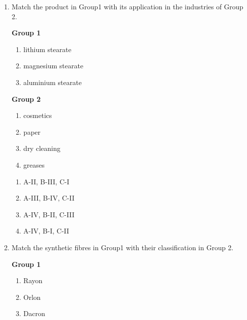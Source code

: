 \documentclass[journal,12pt,onecolumn]{IEEEtran}
\theoremstyle{remark}
\begin{document}
\begin{enumerate}
\begin{multicols}{4}
\begin{enumerate}
    \item A-I, B-IV, C-IV
    \item A-IV, B-I, C-II
    \item A-IV, B-I, C-III
    \item A-IV, B-III, C-I
\end{enumerate}
\end{multicols}

    
    \item Match the product in Group1 with its application in the industries of Group 2.

\begin{multicols}{2}
\textbf{Group 1}
\begin{enumerate}[label =\Alph*]
    \item lithium stearate
    \item magnesium stearate
    \item aluminium stearate
\end{enumerate}

\columnbreak

\textbf{Group 2}
\begin{enumerate}[label =\Roman*]
    \item cosmetics
    \item paper
    \item dry cleaning
    \item greases
\end{enumerate}
\end{multicols}

\begin{multicols}{4}
\begin{enumerate}
    \item A-II, B-III, C-I
    \item A-III, B-IV, C-II
    \item A-IV, B-II, C-III
    \item A-IV, B-I, C-II
\end{enumerate}
\end{multicols}

 \item Match the synthetic fibres in Group1 with their classification in Group 2.

\begin{multicols}{2}
\textbf{Group 1}
\begin{enumerate}[label =\Alph*]
    \item Rayon
    \item Orlon
    \item Dacron
\end{enumerate}


\end{multicols}
\end{enumerate}
\end{document}
